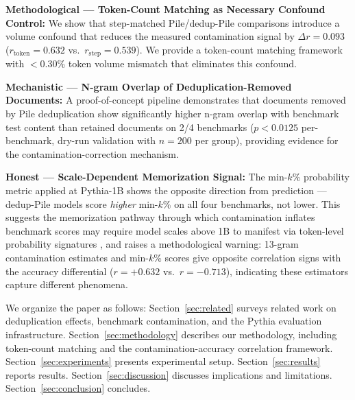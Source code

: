 \textbf{Methodological --- Token-Count Matching as Necessary Confound Control:}
We show that step-matched Pile/dedup-Pile comparisons introduce a volume confound
that reduces the measured contamination signal by $\Delta r = 0.093$ ($r_{\text{token}} = 0.632$
vs.\ $r_{\text{step}} = 0.539$). We provide a token-count matching framework with
$<$0.30\% token volume mismatch that eliminates this confound.

\textbf{Mechanistic --- N-gram Overlap of Deduplication-Removed Documents:}
A proof-of-concept pipeline demonstrates that documents removed by Pile
deduplication show significantly higher n-gram overlap with benchmark test content
than retained documents on 2/4 benchmarks ($p < 0.0125$ per-benchmark, dry-run
validation with $n = 200$ per group), providing evidence for the contamination-correction mechanism.

\textbf{Honest --- Scale-Dependent Memorization Signal:}
The min-$k$\% probability metric \citep{Shi2023Detecting} applied at Pythia-1B shows the
opposite direction from prediction --- dedup-Pile models score \textit{higher} min-$k$\% on
all four benchmarks, not lower. This suggests the memorization pathway through which
contamination inflates benchmark scores may require model scales above 1B to manifest
via token-level probability signatures \citep{Carlini2021Extracting}, and raises a
methodological warning: 13-gram contamination estimates and min-$k$\% scores
give opposite correlation signs with the accuracy differential ($r = +0.632$ vs.\ $r = -0.713$),
indicating these estimators capture different phenomena.

We organize the paper as follows: Section~\ref{sec:related} surveys related work on deduplication
effects, benchmark contamination, and the Pythia evaluation infrastructure.
Section~\ref{sec:methodology} describes our methodology, including token-count matching and the
contamination-accuracy correlation framework. Section~\ref{sec:experiments} presents experimental setup.
Section~\ref{sec:results} reports results. Section~\ref{sec:discussion} discusses implications and limitations.
Section~\ref{sec:conclusion} concludes.
